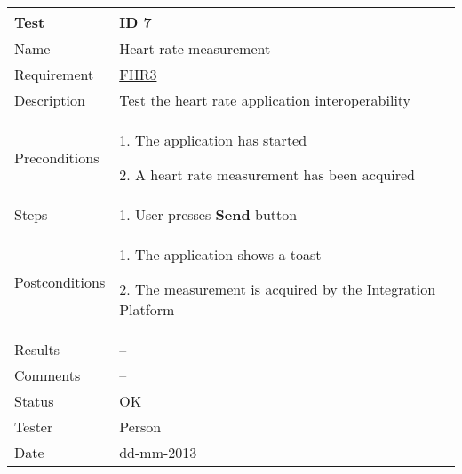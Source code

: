 \begin{table}
\begin{center}
\begin{tabular}{ | l | p{10cm} | }
	\hline
	\textbf{Test}	&	\textbf{ID 7} \\
	\hline\noalign{\smallskip}\noalign{\smallskip}\hline
	Name				& Heart rate measurement \\
	Requirement			& \hyperref[table:reqheartrate]{FHR3} \\
	Description			& Test the heart rate application interoperability \\
	Preconditions		&	\par 1. The application has started
							\par 2. A heart rate measurement has been acquired \\
	Steps 				&	\par 1. User presses \textbf{Send} button \\
	Postconditions		&	\par 1. The application shows a toast
							\par 2. The measurement is acquired by the Integration Platform\\
	Results				& --\\
	Comments			& --\\
	Status				& OK \\
	Tester				& Person \\
	Date				& dd-mm-2013 \\
	\hline
\end{tabular}
\end{center}
\end{table}


